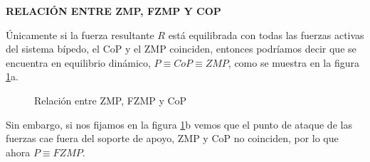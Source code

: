 \textbf{RELACIÓN ENTRE ZMP, FZMP Y COP}

Únicamente si la fuerza resultante $R$ está equilibrada con todas las fuerzas activas del sistema bípedo, el CoP y el ZMP coinciden, entonces podríamos decir que se encuentra en equilibrio dinámico, $P \equiv CoP \equiv ZMP$, como se muestra en la figura \ref{figura224}a. 

\begin{figure}[H]
\centering
{}
\quad
{}
\caption{Relación entre ZMP, FZMP y CoP}
\label{figura224}
\end{figure}

Sin embargo, si nos fijamos en la figura \ref{figura224}b vemos que el punto de ataque de las fuerzas cae fuera del soporte de apoyo, ZMP y CoP no coinciden, por lo que ahora $P \equiv FZMP$.

\afterpage{\null\newpage}
\newpage


